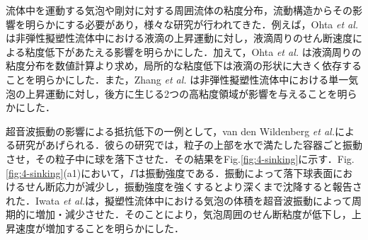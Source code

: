 流体中を運動する気泡や剛対に対する周囲流体の粘度分布，流動構造からその影響を明らかにする必要があり，様々な研究が行われてきた．例えば，Ohta {\it et al.} \cite{ref:2}は非弾性擬塑性流体中における液滴の上昇運動に対し，液滴周りのせん断速度による粘度低下があたえる影響を明らかにした．加えて，Ohta {\it et al.} \cite{ref:3}は液滴周りの粘度分布を数値計算より求め，局所的な粘度低下は液滴の形状に大きく依存することを明らかにした．また，Zhang {\it et al.} \cite{ref:4}は非弾性擬塑性流体中における単一気泡の上昇運動に対し，後方に生じる2つの高粘度領域が影響を与えることを明らかにした．

超音波振動の影響による抵抗低下の一例として，van den Wildenberg {\it et al.}\cite{ref:6}による研究があげられる．彼らの研究では，粒子の上部を水で満たした容器ごと振動させ，その粒子中に球を落下させた．その結果をFig.\ref{fig:4-sinking}に示す．Fig.\ref{fig:4-sinking}(a1)において，$\Gamma$は振動強度である．振動によって落下球表面におけるせん断応力が減少し，振動強度を強くするとより深くまで沈降すると報告された．Iwata {\it et al.}\cite{ref:5}は，擬塑性流体中における気泡の体積を超音波振動によって周期的に増加・減少させた．そのことにより，気泡周囲のせん断粘度が低下し，上昇速度が増加することを明らかにした．

